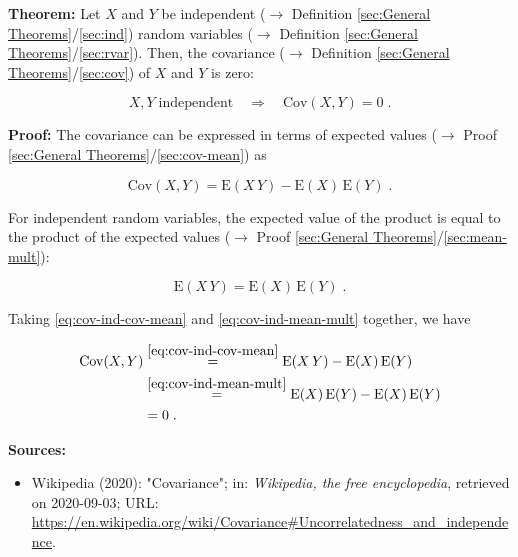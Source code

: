 \documentclass[a4paper,12pt,twoside]{book}
\begin{document}
\textbf{Theorem:} Let $X$ and $Y$ be independent ($\rightarrow$ Definition \ref{sec:General Theorems}/\ref{sec:ind}) random variables ($\rightarrow$ Definition \ref{sec:General Theorems}/\ref{sec:rvar}). Then, the covariance ($\rightarrow$ Definition \ref{sec:General Theorems}/\ref{sec:cov}) of $X$ and $Y$ is zero:

\begin{equation} \label{eq:cov-ind-cov-ind}
X, Y \; \text{independent} \quad \Rightarrow \quad \mathrm{Cov}(X,Y) = 0 \; .
\end{equation}


\vspace{1em}
\textbf{Proof:} The covariance can be expressed in terms of expected values ($\rightarrow$ Proof \ref{sec:General Theorems}/\ref{sec:cov-mean}) as

\begin{equation} \label{eq:cov-ind-cov-mean}
\mathrm{Cov}(X,Y) = \mathrm{E}(X\,Y) - \mathrm{E}(X) \, \mathrm{E}(Y) \; .
\end{equation}

For independent random variables, the expected value of the product is equal to the product of the expected values ($\rightarrow$ Proof \ref{sec:General Theorems}/\ref{sec:mean-mult}):

\begin{equation} \label{eq:cov-ind-mean-mult}
\mathrm{E}(X\,Y) = \mathrm{E}(X) \, \mathrm{E}(Y) \; .
\end{equation}

Taking \eqref{eq:cov-ind-cov-mean} and \eqref{eq:cov-ind-mean-mult} together, we have

\begin{equation} \label{eq:cov-ind-cov-ind-qed}
\begin{split}
\mathrm{Cov}(X,Y) &\overset{\eqref{eq:cov-ind-cov-mean}}{=} \mathrm{E}(X\,Y) - \mathrm{E}(X) \, \mathrm{E}(Y) \\
&\overset{\eqref{eq:cov-ind-mean-mult}}{=} \mathrm{E}(X) \, \mathrm{E}(Y) - \mathrm{E}(X) \, \mathrm{E}(Y) \\
&= 0 \; .
\end{split}
\end{equation}


\vspace{1em}
\textbf{Sources:}
\begin{itemize}
\item Wikipedia (2020): "Covariance"; in: \textit{Wikipedia, the free encyclopedia}, retrieved on 2020-09-03; URL: \url{https://en.wikipedia.org/wiki/Covariance#Uncorrelatedness_and_independence}.
\end{itemize}
\end{document}
